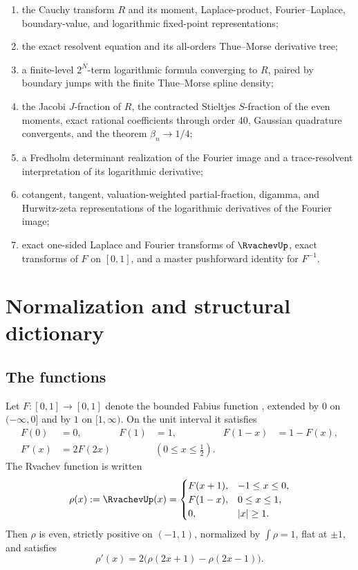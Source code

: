 \documentclass[11pt]{article}
\theoremstyle{definition}
\theoremstyle{remark}
\begin{document}
\begin{enumerate}
\item the Cauchy transform \(R\) and its moment, Laplace-product, Fourier--Laplace,
      boundary-value, and logarithmic fixed-point representations;
\item the exact resolvent equation and its all-orders Thue--Morse derivative tree;
\item a finite-level \(2^N\)-term logarithmic formula converging to \(R\), paired by
      boundary jumps with the finite Thue--Morse spline density;
\item the Jacobi \(J\)-fraction of \(R\), the contracted Stieltjes \(S\)-fraction of the
      even moments, exact rational coefficients through order 40, Gaussian quadrature
      convergents, and the theorem \(\beta_n\to1/4\);
\item a Fredholm determinant realization of the Fourier image and a trace-resolvent
      interpretation of its logarithmic derivative;
\item cotangent, tangent, valuation-weighted partial-fraction, digamma, and Hurwitz-zeta
      representations of the logarithmic derivatives of the Fourier image;
\item exact one-sided Laplace and Fourier transforms of \(\RvachevUp\), exact transforms of
      \(F\) on \([0,1]\), and a master pushforward identity for \(F^{-1}\).
\end{enumerate}

\section{Normalization and structural dictionary}

\subsection{The functions}

Let \(F:[0,1]\to[0,1]\) denote the bounded Fabius function \cite{p6:Fabius1966,p6:AriasTranslation}, extended by \(0\) on
\(( -\infty,0]\) and by \(1\) on \([1,\infty)\).  On the unit interval it satisfies
\begin{align}
 F(0)&=0, & F(1)&=1, & F(1-x)&=1-F(x), \label{p6:eq:F-symmetry}\\
 F'(x)&=2F(2x) &&(0\le x\le\tfrac12). \label{p6:eq:F-diff}
\end{align}
The Rvachev function is written
\begin{equation}
 \rho(x):=\RvachevUp(x)=
 \begin{cases}
 F(x+1),&-1\le x\le0,\\
 F(1-x),&0\le x\le1,\\
 0,&|x|\ge1.
 \end{cases}                                                \label{p6:eq:rho-fold}
\end{equation}
Then \(\rho\) is even, strictly positive on \((-1,1)\), normalized by
\(\int\rho=1\), flat at \(\pm1\), and satisfies
\begin{equation}
 \rho'(x)=2\bigl(\rho(2x+1)-\rho(2x-1)\bigr).                \label{p6:eq:rho-dde}
\end{equation}
\end{document}
